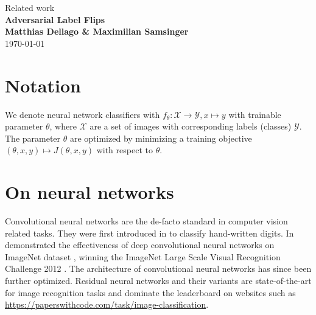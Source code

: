 \documentclass{article}
\begin{document}
\begin{titlepage}
	\noindent{}
	\vspace{3cm}
	\begin{center}
		{\Large Related work}
		\vspace{50pt}\\
		\textbf{\Huge Adversarial Label Flips}
		\vspace{40pt}\\
		\textbf{\Large Matthias Dellago \& Maximilian Samsinger}\vspace{20pt}\\
		{\large\today}
		\vspace{120pt}
	\end{center}
\end{titlepage}
	
	\DeclarePairedDelimiter\abs{\lvert}{\rvert}%
	\DeclarePairedDelimiter\norm{\lVert}{\rVert}%
	\DeclarePairedDelimiter\ceil{\lceil}{\rceil}
	\DeclarePairedDelimiter\floor{\lfloor}{\rfloor}

\section{Notation}
We denote neural network classifiers with ${f_\theta\colon\mathcal{X}\to\mathcal{Y}, x\mapsto y}$ with trainable parameter $\theta$, where $\mathcal{X}$ are a set of images with corresponding labels (classes) $\mathcal{Y}$. The parameter $\theta$ are optimized by minimizing a training objective ${(\theta, x, y) \mapsto J(\theta, x, y)}$ with respect to $\theta$.

\section{On neural networks}	
Convolutional neural networks are the de-facto standard in computer vision related tasks. They were first introduced in \cite{lecun1989backpropagation} to classify hand-written digits. In
\cite{krizhevsky2012imagenet} demonstrated the effectiveness of deep convolutional neural networks on ImageNet dataset \cite{deng2009imagenet}, winning the ImageNet Large Scale Visual Recognition Challenge 2012 \cite{ILSVRC15}. The architecture of convolutional neural networks has since been further optimized. Residual neural networks \cite{he2016deep} and their variants are state-of-the-art for image recognition tasks and dominate the leaderboard on websites such as \url{https://paperswithcode.com/task/image-classification}.
\end{document}
